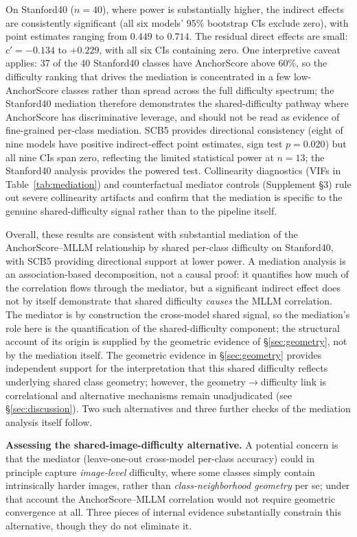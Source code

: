\documentclass[a4paper,fleqn]{cas-sc}
\begin{document}
 On Stanford40 ($n=40$), where power is substantially higher, the indirect effects are consistently significant (all six models' 95\% bootstrap CIs exclude zero), with point estimates ranging from $0.449$ to $0.714$. The residual direct effects are small: $c' = -0.134$ to $+0.229$, with all six CIs containing zero. One interpretive caveat applies: 37 of the 40 Stanford40 classes have AnchorScore above 60\%, so the difficulty ranking that drives the mediation is concentrated in a few low-AnchorScore classes rather than spread across the full difficulty spectrum; the Stanford40 mediation therefore demonstrates the shared-difficulty pathway where AnchorScore has discriminative leverage, and should not be read as evidence of fine-grained per-class mediation. SCB5 provides directional consistency (eight of nine models have positive indirect-effect point estimates, sign test $p=0.020$) but all nine CIs span zero, reflecting the limited statistical power at $n=13$; the Stanford40 analysis provides the powered test. Collinearity diagnostics (VIFs in Table~\ref{tab:mediation}) and counterfactual mediator controls (Supplement \S3) rule out severe collinearity artifacts and confirm that the mediation is specific to the genuine shared-difficulty signal rather than to the pipeline itself.

Overall, these results are consistent with substantial mediation of the AnchorScore--MLLM relationship by shared per-class difficulty on Stanford40, with SCB5 providing directional support at lower power. A mediation analysis is an association-based decomposition, not a causal proof: it quantifies how much of the correlation flows through the mediator, but a significant indirect effect does not by itself demonstrate that shared difficulty \emph{causes} the MLLM correlation. The mediator is by construction the cross-model shared signal, so the mediation's role here is the quantification of the shared-difficulty component; the structural account of its origin is supplied by the geometric evidence of \S\ref{sec:geometry}, not by the mediation itself. The geometric evidence in \S\ref{sec:geometry} provides independent support for the interpretation that this shared difficulty reflects underlying shared class geometry; however, the geometry$\rightarrow$difficulty link is correlational and alternative mechanisms remain unadjudicated (see \S\ref{sec:discussion}). Two such alternatives and three further checks of the mediation analysis itself follow.

\textbf{Assessing the shared-image-difficulty alternative.}
A potential concern is that the mediator (leave-one-out cross-model per-class accuracy) could in principle capture \emph{image-level} difficulty, where some classes simply contain intrinsically harder images, rather than \emph{class-neighborhood geometry} per se; under that account the AnchorScore--MLLM correlation would not require geometric convergence at all. Three pieces of internal evidence substantially constrain this alternative, though they do not eliminate it.
\end{document}
